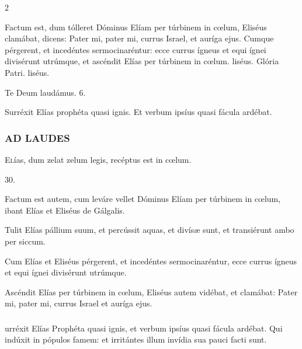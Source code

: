 \documentclass[9pt,twoside]{extarticle}
\begin{document}
\begin{multicols}{2}
\begin{tightlist}{}
\item {} Factum est, dum tólleret Dóminus Elíam per túrbinem in cœlum, \textred{*} Eliséus clamábat, dicens: Pater mi, pater mi, currus Israel, et auríga ejus.  Cumque pérgerent, et incedéntes sermocinaréntur: ecce currus ígneus et equi ígnei divisérunt utrúmque, et ascéndit Elías per túrbinem in cœlum. liséus. Glória Patri. liséus.
\item Te Deum laudámus. 6.
\item {} Surréxit Elías prophéta quasi ignis.  Et verbum ipsíus quasi fácula ardébat.
\end{tightlist}

\subsubsection*{\center \textsc{AD LAUDES}}
\begin{center}\end{center}
\lettrine{E}lías, dum zelat zelum legis, recéptus est in cœlum.

\begin{tightlist}
\item {} 30.
\item {} Factum est autem, cum leváre vellet Dóminus Elíam per túrbinem in cœlum, ibant Elías et Eliséus de Gálgalis.
\item {} Tulit Elías pállium suum, et percússit aquas, et divísæ sunt, et transiérunt ambo per siccum.
\item {} Cum Elías et Eliséus pérgerent, et incedéntes sermocinaréntur, ecce currus ígneus et equi ígnei divisérunt utrúmque.
\item {} Ascéndit Elías per túrbinem in cœlum, Eliséus autem vidébat, et clamábat: Pater mi, pater mi, currus Israel et auríga ejus.
\end{tightlist}

\subsubsection*{}
urréxit Elías Prophéta quasi ignis, et verbum ipsíus quasi fácula ardébat. Qui indúxit in pópulos famem: et irritántes illum invídia sua pauci facti sunt.


\end{multicols}
\end{document}
